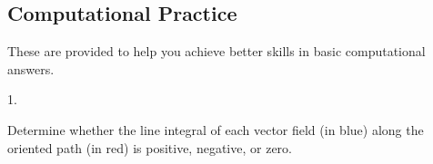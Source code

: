 \documentclass[10pt,]{book}
\theoremstyle{plain}
\theoremstyle{definition}
\theoremstyle{definition}
\theoremstyle{definition}
\theoremstyle{definition}
\theoremstyle{definition}
\numberwithin{equation}{section}
\begin{document}
\subsection[{Computational Practice}]{Computational Practice}\label{exercises-19}
These are provided to help you achieve better skills in basic computational answers.%
\begin{exerciselist}
\item[1.]\hypertarget{exercise-83}{}\mbox{}\\ %
\begin{mdframed}
{
Determine whether the line integral of each 
vector field (in blue) along the  
oriented path (in red) is positive, negative, or zero.  
\leavevmode\\\relax 
\leavevmode\\\relax 
\begin{center}
\par\medskip\centerline{\kern 0pt\vbox{}}
\end{center}}
\end{mdframed}
\end{exerciselist}
\end{document}
